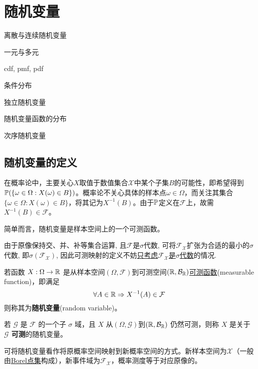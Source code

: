 \chapter{随机变量}

\begin{introduction}
    \item 离散与连续随机变量
    \item 一元与多元
    \item cdf, pmf, pdf
    \item 条件分布
    \item 独立随机变量
    \item 随机变量函数的分布
    \item 次序随机变量
\end{introduction}

\section{随机变量的定义}

在概率论中，主要关心$X$取值于数值集合$\mathcal{X}$中某个子集$B$的可能性，即希望得到$\P(\{\omega\in\Omega : X(\omega) \in B\})$。概率论不关心具体的样本点$\omega\in\Omega$，而关注其集合$\{\omega\in\Omega : X(\omega) \in B\}$，将其记为$X^{-1}(B)$。由于$\P$定义在$\mathscr{F}$上，故需$X^{-1}(B) \in \mathscr{F}$。

简单而言，随机变量是样本空间上的一个可测函数。

由于原像保持交、并、补等集合运算, 且$\mathscr{F}$是$\sigma$代数, 可将$\mathscr{F}_{\mathcal{X}}$扩张为合适的最小的$\sigma$代数, 即$\sigma(\mathscr{F}_{\mathcal{X}})$, 因此可测映射的定义不妨\underline{只考虑$\mathscr{F}_{\mathcal{X}}$是$\sigma$代数}的情况.

\begin{definition}[随机变量]
    若函数 $X : \Omega \to \R$ 是从样本空间$(\Omega,\mathcal{F})$到可测空间$(\R,\mathcal{B}_{\R})$\underline{可测函数}(measurable function)，即满足
    \[ \forall A \in \mathcal{\R} \Rightarrow  X^{-1}(A)\in \mathcal{F} \]
    则称其为\textbf{随机变量}(random variable)。

    若 $\mathcal{G}$ 是 $\mathcal{F}$ 的一个子 $\sigma$ 域，且 $X$ 从$(\Omega,\mathcal{G})$到$(\R,\mathcal{B}_{\R})$ 仍然可测，则称 $X$ 是关于\textbf{$\mathcal{G}$ 可测}的随机变量。
\end{definition}

可将随机变量看作将原概率空间映射到新概率空间的方式。新样本空间为$\mathcal{X}$（一般由\underline{Borel点集}构成），新事件域为$\mathscr{F}_{\mathcal{X}}$，概率测度等于对应原像的。

